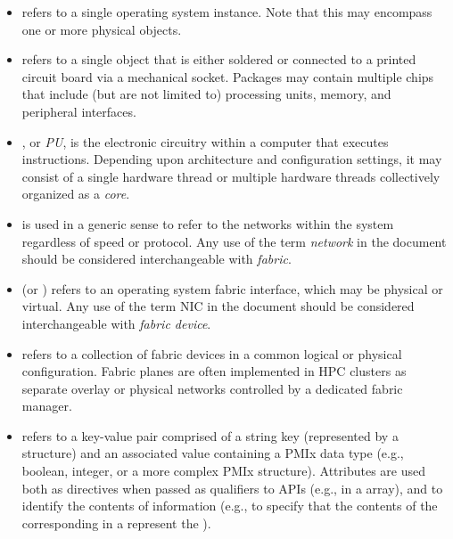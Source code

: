 \begin{itemize}
\item {} refers to a single operating system instance. Note that this may encompass one or more physical objects.

\item {} refers to a single object that is either soldered or connected to a printed circuit board via a mechanical socket. Packages may contain multiple chips that include (but are not limited to) processing units, memory, and peripheral interfaces.

\item {}, or \emph{PU}, is the electronic circuitry within a computer that executes instructions. Depending upon architecture and configuration settings, it may consist of a single hardware thread or multiple hardware threads collectively organized as a \emph{core}.

\item {} is used in a generic sense to refer to the networks within the system regardless of speed or protocol. Any use of the term \emph{network} in the document should be considered interchangeable with \emph{fabric}.

\item {} (or ) refers to an operating system fabric interface, which may be physical or virtual. Any use of the term \ac{NIC} in the document should be considered interchangeable with \emph{fabric device}.

\item {} refers to a collection of fabric devices in a common logical or physical configuration. Fabric planes are often implemented in \ac{HPC} clusters as separate overlay or physical networks controlled by a dedicated fabric manager.

\item {} refers to a key-value pair comprised of a string key (represented by a  structure) and an associated value containing a \ac{PMIx} data type (e.g., boolean, integer, or a more complex \ac{PMIx} structure). Attributes are used both as directives when passed as qualifiers to \acp{API} (e.g., in a  array), and to identify the contents of information (e.g., to specify that the contents of the corresponding  in a  represent the ).


\end{itemize}
